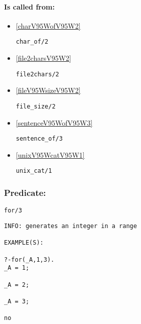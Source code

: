 \paragraph{Is called from:} 
\begin{itemize}
\item \ref{charV95WofV95W2} 
\begin{verbatim}
char_of/2
\end{verbatim}

\item \ref{file2charsV95W2} 
\begin{verbatim}
file2chars/2
\end{verbatim}

\item \ref{fileV95WsizeV95W2} 
\begin{verbatim}
file_size/2
\end{verbatim}

\item \ref{sentenceV95WofV95W3} 
\begin{verbatim}
sentence_of/3
\end{verbatim}

\item \ref{unixV95WcatV95W1} 
\begin{verbatim}
unix_cat/1
\end{verbatim}

\end{itemize}

\subsubsection{Predicate:} \label{forV95W3}

\begin{verbatim}
for/3
\end{verbatim}

{\small \begin{verbatim}
INFO: generates an integer in a range

EXAMPLE(S):

?-for(_A,1,3).
_A = 1;

_A = 2;

_A = 3;

no

\end{verbatim}}
